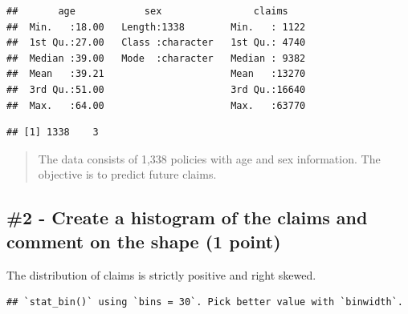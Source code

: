 \documentclass[]{book}
\newenvironment{Shaded}{\begin{snugshade}}{\end{snugshade}}
\newcommand{\KeywordTok}[1]{\textcolor[rgb]{0.13,0.29,0.53}{\textbf{#1}}}
\newcommand{\NormalTok}[1]{#1}
\newcommand{\OperatorTok}[1]{\textcolor[rgb]{0.81,0.36,0.00}{\textbf{#1}}}
\newcommand{\StringTok}[1]{\textcolor[rgb]{0.31,0.60,0.02}{#1}}
\begin{document}
\begin{verbatim}
##       age            sex                claims     
##  Min.   :18.00   Length:1338        Min.   : 1122  
##  1st Qu.:27.00   Class :character   1st Qu.: 4740  
##  Median :39.00   Mode  :character   Median : 9382  
##  Mean   :39.21                      Mean   :13270  
##  3rd Qu.:51.00                      3rd Qu.:16640  
##  Max.   :64.00                      Max.   :63770
\end{verbatim}

\begin{Shaded}
\end{Shaded}

\begin{verbatim}
## [1] 1338    3
\end{verbatim}

\begin{quote}
The data consists of 1,338 policies with age and sex information. The objective is to predict future claims.
\end{quote}

\hypertarget{create-a-histogram-of-the-claims-and-comment-on-the-shape-1-point}{%
\subsection{\#2 - Create a histogram of the claims and comment on the shape (1 point)}\label{create-a-histogram-of-the-claims-and-comment-on-the-shape-1-point}}

The distribution of claims is strictly positive and right skewed.

\begin{Shaded}
\end{Shaded}

\begin{verbatim}
## `stat_bin()` using `bins = 30`. Pick better value with `binwidth`.
\end{verbatim}
\end{document}
